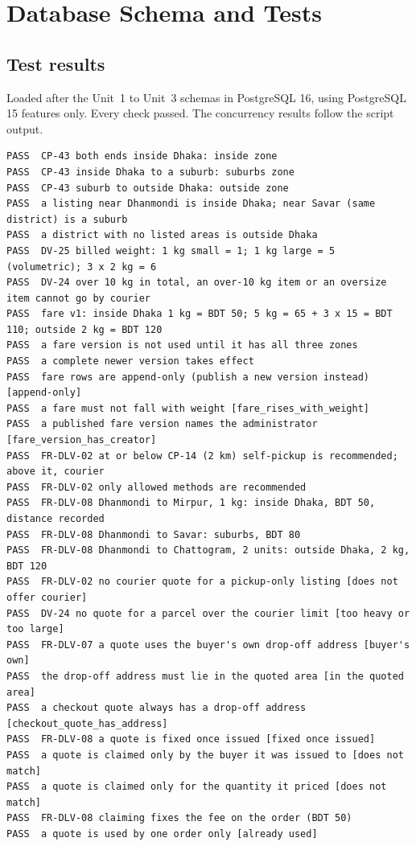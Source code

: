 \documentclass[11pt,a4paper]{article}
\begin{document}
\section{Database Schema and Tests}
\label{app:ddl}
\subsection{Test results}
\label{app:tests}
Loaded after the Unit~1 to Unit~3 schemas in PostgreSQL 16, using PostgreSQL 15 features only. Every check passed. The concurrency results follow the script output.
{\scriptsize
\begin{verbatim}
PASS  CP-43 both ends inside Dhaka: inside zone
PASS  CP-43 inside Dhaka to a suburb: suburbs zone
PASS  CP-43 suburb to outside Dhaka: outside zone
PASS  a listing near Dhanmondi is inside Dhaka; near Savar (same district) is a suburb
PASS  a district with no listed areas is outside Dhaka
PASS  DV-25 billed weight: 1 kg small = 1; 1 kg large = 5 (volumetric); 3 x 2 kg = 6
PASS  DV-24 over 10 kg in total, an over-10 kg item or an oversize item cannot go by courier
PASS  fare v1: inside Dhaka 1 kg = BDT 50; 5 kg = 65 + 3 x 15 = BDT 110; outside 2 kg = BDT 120
PASS  a fare version is not used until it has all three zones
PASS  a complete newer version takes effect
PASS  fare rows are append-only (publish a new version instead) [append-only]
PASS  a fare must not fall with weight [fare_rises_with_weight]
PASS  a published fare version names the administrator [fare_version_has_creator]
PASS  FR-DLV-02 at or below CP-14 (2 km) self-pickup is recommended; above it, courier
PASS  FR-DLV-02 only allowed methods are recommended
PASS  FR-DLV-08 Dhanmondi to Mirpur, 1 kg: inside Dhaka, BDT 50, distance recorded
PASS  FR-DLV-08 Dhanmondi to Savar: suburbs, BDT 80
PASS  FR-DLV-08 Dhanmondi to Chattogram, 2 units: outside Dhaka, 2 kg, BDT 120
PASS  FR-DLV-02 no courier quote for a pickup-only listing [does not offer courier]
PASS  DV-24 no quote for a parcel over the courier limit [too heavy or too large]
PASS  FR-DLV-07 a quote uses the buyer's own drop-off address [buyer's own]
PASS  the drop-off address must lie in the quoted area [in the quoted area]
PASS  a checkout quote always has a drop-off address [checkout_quote_has_address]
PASS  FR-DLV-08 a quote is fixed once issued [fixed once issued]
PASS  a quote is claimed only by the buyer it was issued to [does not match]
PASS  a quote is claimed only for the quantity it priced [does not match]
PASS  FR-DLV-08 claiming fixes the fee on the order (BDT 50)
PASS  a quote is used by one order only [already used]

\end{verbatim}}
\end{document}
